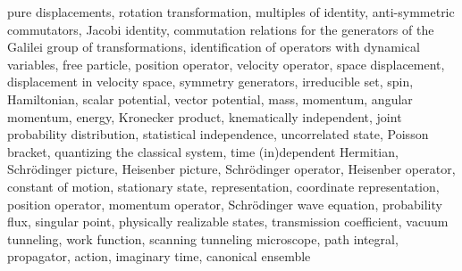 \begin{multicols}{3}
  pure displacements,
  rotation transformation,
  multiples of identity,
  anti-symmetric commutators,
  Jacobi identity,
  commutation relations for the generators of the Galilei group of transformations,
  identification of operators with dynamical variables,
  free particle,
  position operator,
  velocity operator,
  space displacement,
  displacement in velocity space,
  symmetry generators,
  irreducible set,
  spin,
  Hamiltonian,
  scalar potential,
  vector potential,
  mass,
  momentum,
  angular momentum,
  energy,
  Kronecker product,
  knematically independent,
  joint probability distribution,
  statistical independence,
  uncorrelated state,
  Poisson bracket,
  quantizing the classical system,
  time (in)dependent Hermitian,
  Schr\"odinger picture,
  Heisenber picture,
  Schr\"odinger operator,
  Heisenber operator,
  constant of motion,
  stationary state,
  representation,
  coordinate representation,
  position operator,
  momentum operator,
  Schr\"odinger wave equation,
  probability flux,
  singular point,
  physically realizable states,
  transmission coefficient,
  vacuum tunneling,
  work function,
  scanning tunneling microscope,
  path integral,
  propagator,
  action,
  imaginary time,
  canonical ensemble  
\end{multicols}

